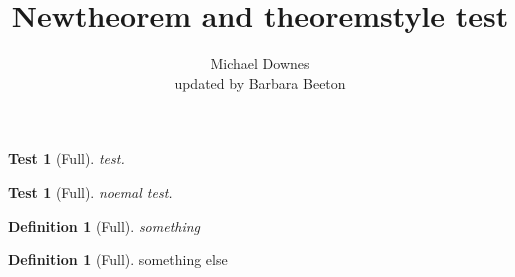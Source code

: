 \documentclass{article}
\title{Newtheorem and theoremstyle test}
\author{Michael Downes\\updated by Barbara Beeton}
\theoremstyle{varplain}
\newtheorem{test}{Test}
\theoremstyle{plain}
\newtheorem{testt}{Test}
\theoremstyle{vardefinition}
\newtheorem{defnv}{Definition}
\theoremstyle{definition}
\newtheorem{defn}{Definition}
\begin{document}
\begin{test}[Full]
test.
\end{test}

\begin{testt}[Full]
noemal test.
\end{testt}

\begin{defnv}[Full]
something
\end{defnv}

\begin{defn}[Full]
something else
\end{defn}
\end{document}
